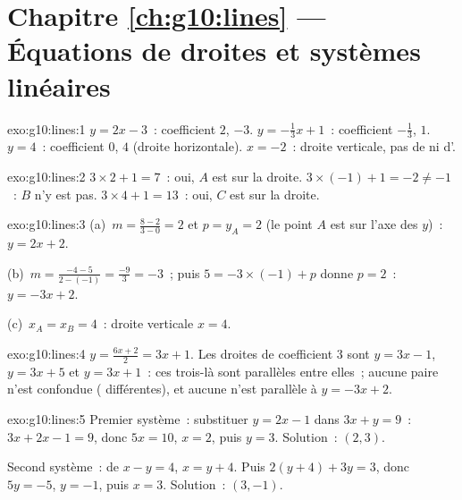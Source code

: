 \section*{Chapitre \ref{ch:g10:lines} --- Équations de droites et systèmes linéaires}

\begin{solution}{exo:g10:lines:1}
$y = 2x - 3$~: coefficient $2$,  $-3$.
$y = -\frac13 x + 1$~: coefficient $-\frac13$,  $1$.
$y = 4$~: coefficient $0$,  $4$ (droite
horizontale).
$x = -2$~: droite verticale, pas de  ni d'.
\end{solution}

\begin{solution}{exo:g10:lines:2}
$3 \times 2 + 1 = 7$~: oui, $A$ est sur la droite.
$3 \times (-1) + 1 = -2 \neq -1$~: $B$ n'y est pas.
$3 \times 4 + 1 = 13$~: oui, $C$ est sur la droite.
\end{solution}

\begin{solution}{exo:g10:lines:3}
(a)~$m = \frac{8 - 2}{3 - 0} = 2$ et $p = y_A = 2$ (le point $A$ est
sur l'axe des $y$)~: $y = 2x + 2$.

(b)~$m = \frac{-4 - 5}{2 - (-1)} = \frac{-9}{3} = -3$~; puis
$5 = -3 \times (-1) + p$ donne $p = 2$~: $y = -3x + 2$.

(c)~$x_A = x_B = 4$~: droite verticale $x = 4$.
\end{solution}

\begin{solution}{exo:g10:lines:4}
$y = \frac{6x+2}{2} = 3x + 1$. Les droites de coefficient $3$ sont
$y = 3x - 1$, $y = 3x + 5$ et $y = 3x + 1$~: ces trois-là sont parallèles
entre elles~; aucune paire n'est confondue (
différentes), et aucune n'est parallèle à $y = -3x + 2$.
\end{solution}

\begin{solution}{exo:g10:lines:5}
Premier système~: substituer $y = 2x - 1$ dans $3x + y = 9$~:
$3x + 2x - 1 = 9$, donc $5x = 10$, $x = 2$, puis $y = 3$. Solution~:
$(2, 3)$.

Second système~: de $x - y = 4$, $x = y + 4$. Puis
$2(y + 4) + 3y = 3$, donc $5y = -5$, $y = -1$, puis $x = 3$. Solution~:
$(3, -1)$.
\end{solution}

